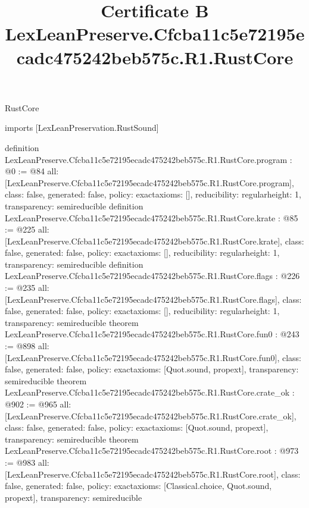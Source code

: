 \begin{lexlean}{RustCore}
\title{Certificate B LexLeanPreserve.Cfcba11c5e72195ecadc475242beb575c.R1.RustCore}
\begin{coremodule}
imports [LexLeanPreservation.RustSound]

definition LexLeanPreserve.Cfcba11c5e72195ecadc475242beb575c.R1.RustCore.program : @0 := @84 {
  all: [LexLeanPreserve.Cfcba11c5e72195ecadc475242beb575c.R1.RustCore.program],
  class: false,
  generated: false,
  policy: exact{axioms: []},
  reducibility: regular{height: 1},
  transparency: semireducible
}
definition LexLeanPreserve.Cfcba11c5e72195ecadc475242beb575c.R1.RustCore.krate : @85 := @225 {
  all: [LexLeanPreserve.Cfcba11c5e72195ecadc475242beb575c.R1.RustCore.krate],
  class: false,
  generated: false,
  policy: exact{axioms: []},
  reducibility: regular{height: 1},
  transparency: semireducible
}
definition LexLeanPreserve.Cfcba11c5e72195ecadc475242beb575c.R1.RustCore.flags : @226 := @235 {
  all: [LexLeanPreserve.Cfcba11c5e72195ecadc475242beb575c.R1.RustCore.flags],
  class: false,
  generated: false,
  policy: exact{axioms: []},
  reducibility: regular{height: 1},
  transparency: semireducible
}
theorem LexLeanPreserve.Cfcba11c5e72195ecadc475242beb575c.R1.RustCore.fun0 : @243 := @898 {
  all: [LexLeanPreserve.Cfcba11c5e72195ecadc475242beb575c.R1.RustCore.fun0],
  class: false,
  generated: false,
  policy: exact{axioms: [Quot.sound, propext]},
  transparency: semireducible
}
theorem LexLeanPreserve.Cfcba11c5e72195ecadc475242beb575c.R1.RustCore.crate_ok : @902 := @965 {
  all: [LexLeanPreserve.Cfcba11c5e72195ecadc475242beb575c.R1.RustCore.crate_ok],
  class: false,
  generated: false,
  policy: exact{axioms: [Quot.sound, propext]},
  transparency: semireducible
}
theorem LexLeanPreserve.Cfcba11c5e72195ecadc475242beb575c.R1.RustCore.root : @973 := @983 {
  all: [LexLeanPreserve.Cfcba11c5e72195ecadc475242beb575c.R1.RustCore.root],
  class: false,
  generated: false,
  policy: exact{axioms: [Classical.choice, Quot.sound, propext]},
  transparency: semireducible
}


\end{coremodule}
\end{lexlean}
